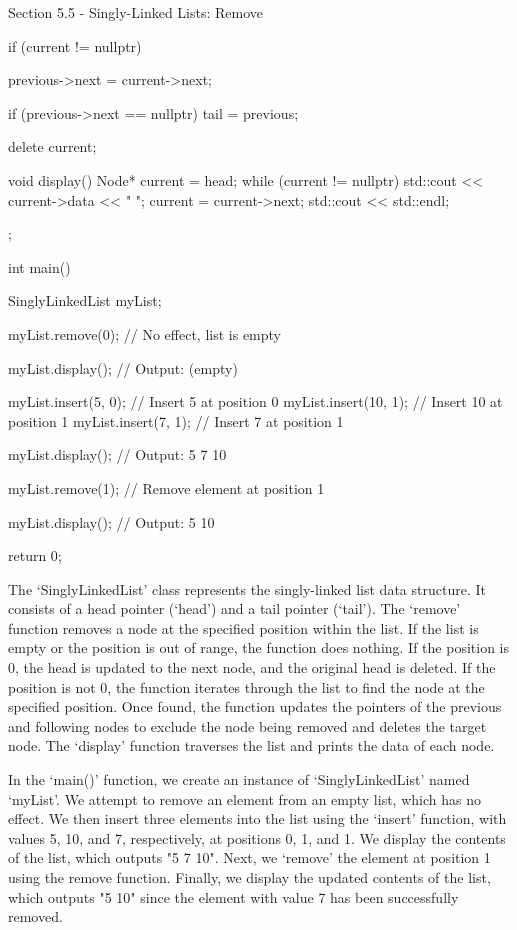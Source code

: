 \begin{notes}{Section 5.5 - Singly-Linked Lists: Remove}
\begin{highlight}
\begin{code}[C++]
{{{                if (current != nullptr) {
                    previous->next = current->next;
    
                    if (previous->next == nullptr)
                        tail = previous;
    
                    delete current;
                }
            }
        }
    
        void display() {
            Node* current = head;
            while (current != nullptr) {
                std::cout << current->data << " ";
                current = current->next;
            }
            std::cout << std::endl;
        }
    };
    
    int main() {
        SinglyLinkedList myList;
    
        myList.remove(0);  // No effect, list is empty
    
        myList.display();  // Output: (empty)
    
        myList.insert(5, 0);   // Insert 5 at position 0
        myList.insert(10, 1);  // Insert 10 at position 1
        myList.insert(7, 1);   // Insert 7 at position 1
    
        myList.display();  // Output: 5 7 10
    
        myList.remove(1);  // Remove element at position 1
    
        myList.display();  // Output: 5 10
    
        return 0;
    }        
    \end{code}
        The `SinglyLinkedList' class represents the singly-linked list data structure. It consists of a head pointer (`head') and a tail pointer (`tail'). The `remove' function removes a node at the specified position within the list. If the list is empty or the position 
        is out of range, the function does nothing. If the position is 0, the head is updated to the next node, and the original head is deleted. If the position is not 0, the function iterates through the list to find the node at the specified position. Once found, the 
        function updates the pointers of the previous and following nodes to exclude the node being removed and deletes the target node. The `display' function traverses the list and prints the data of each node.
    
        In the `main()' function, we create an instance of `SinglyLinkedList' named `myList'. We attempt to remove an element from an empty list, which has no effect. We then insert three elements into the list using the `insert' function, with values 5, 10, and 7, respectively, 
        at positions 0, 1, and 1. We display the contents of the list, which outputs "5 7 10". Next, we `remove' the element at position 1 using the remove function. Finally, we display the updated contents of the list, which outputs "5 10" since the element with value 7 has 
        been successfully removed.
    

\end{highlight}
\end{notes}
